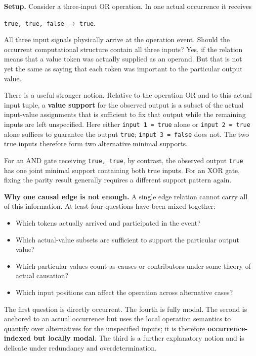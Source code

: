 \documentclass[11pt,a4paper]{article}
\newcounter{thought}
\newenvironment{thoughtbox}[1]{%
  \refstepcounter{thought}%
  \begin{tcolorbox}[
    enhanced,breakable,
    colback=white,colframe=navy,boxrule=0.85pt,
    arc=1.7mm,left=2.8mm,right=2.8mm,top=2.2mm,bottom=2.0mm,
    borderline west={2.2pt}{0pt}{blue},
    title={\large\bfseries Thought experiment \thethought: #1},
    fonttitle=\bfseries,coltitle=navy,
    attach boxed title to top left={xshift=2mm,yshift=-2mm},
    boxed title style={colback=sky,colframe=blue,boxrule=0.55pt,arc=1.2mm},
    before skip=9pt,after skip=10pt
  ]
}{\end{tcolorbox}}
\newcommand{\scene}{\medskip\textbf{Setup.} }
\begin{document}
\begin{thoughtbox}{Participation, contribution, and value support}
\scene Consider a three-input OR operation. In one actual occurrence it receives
\begin{center}
\texttt{true, true, false} $\longrightarrow$ \texttt{true}.
\end{center}
All three input signals physically arrive at the operation event. Should the occurrent computational structure contain all three inputs? Yes, if the relation means that a value token was actually supplied as an operand. But that is not yet the same as saying that each token was important to the particular output value.

There is a useful stronger notion. Relative to the operation OR and to this actual input tuple, a \textbf{value support} for the observed output is a subset of the actual input-value assignments that is sufficient to fix that output while the remaining inputs are left unspecified. Here either \texttt{input 1 = true} alone or \texttt{input 2 = true} alone suffices to guarantee the output \texttt{true}; \texttt{input 3 = false} does not. The two true inputs therefore form two alternative minimal supports.

For an AND gate receiving \texttt{true, true}, by contrast, the observed output \texttt{true} has one joint minimal support containing both true inputs. For an XOR gate, fixing the parity result generally requires a different support pattern again.

\medskip\textbf{Why one causal edge is not enough.} A single edge relation cannot carry all of this information. At least four questions have been mixed together:
\begin{itemize}
  \item Which tokens actually arrived and participated in the event?
  \item Which actual-value subsets are sufficient to support the particular output value?
  \item Which particular values count as causes or contributors under some theory of actual causation?
  \item Which input positions can affect the operation across alternative cases?
\end{itemize}
The first question is directly occurrent. The fourth is fully modal. The second is anchored to an actual occurrence but uses the local operation semantics to quantify over alternatives for the unspecified inputs; it is therefore \textbf{occurrence-indexed but locally modal}. The third is a further explanatory notion and is delicate under redundancy and overdetermination.


\end{thoughtbox}
\end{document}
